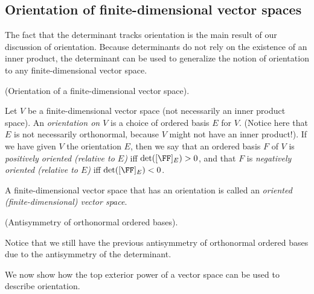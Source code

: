 \subsection*{Orientation of finite-dimensional vector spaces}

\label{ch::exterior_pwrs::orientation_finite_dim_vector_space}

The fact that the determinant tracks orientation is the main result of our discussion of orientation. Because determinants do not rely on the existence of an inner product, the determinant can be used to generalize the notion of orientation to any finite-dimensional vector space.

\begin{defn}
\label{ch::exterior_pwrs::defn::orientation_finite_dim_vector_space}
    (Orientation of a finite-dimensional vector space).
    
    Let $V$ be a finite-dimensional vector space (not necessarily an inner product space). An \textit{orientation on $V$} is a choice of ordered basis $E$ for $V$. (Notice here that $E$ is not necessarily orthonormal, because $V$ might not have an inner product!). If we have given $V$ the orientation $E$, then we say that an ordered basis $F$ of $V$ is \textit{positively oriented (relative to $E$)} iff $\det([\FF]_E) > 0$, and that $F$ is \textit{negatively oriented (relative to $E$)} iff $\det([\FF]_E) < 0$.
    
    A finite-dimensional vector space that has an orientation is called an \textit{oriented (finite-dimensional) vector space}.
\end{defn}
 
\begin{remark}
    (Antisymmetry of orthonormal ordered bases).
    
    Notice that we still have the previous antisymmetry of orthonormal ordered bases due to the antisymmetry of the determinant.
\end{remark}
 
We now show how the top exterior power of a vector space can be used to describe orientation. 

